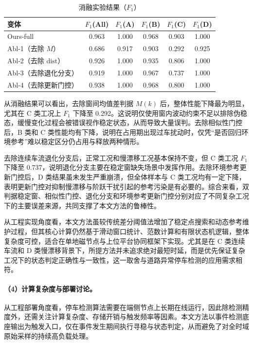 \documentclass{xdupgthesis}
\begin{document}
\begin{table}[!htbp]
    \centering
    \caption{消融实验结果（$F_1$）}
    \label{tab:ch4_ablation}
    \small
    \setlength{\tabcolsep}{7pt}
    \begin{tabular}{lccccc}
        \hline
        变体 & $F_1$(All) & $F_1$(A) & $F_1$(B) & $F_1$(C) & $F_1$(D) \\
        \hline
        Ours-full & 0.963 & 1.000 & 0.968 & 0.903 & 1.000 \\
        Abl-1（去除 $M$） & 0.686 & 0.917 & 0.903 & 0.292 & 0.925 \\
        Abl-2（去除 $\mathrm{dist}$） & 0.926 & 1.000 & 0.935 & 0.806 & 1.000 \\
        Abl-3（去除退化分支） & 0.919 & 1.000 & 0.967 & 0.737 & 1.000 \\
        Abl-4（去除更新门控） & 0.938 & 1.000 & 0.968 & 0.800 & 1.000 \\
        \hline
    \end{tabular}
\end{table}

从消融结果可以看出，去除窗间均值差判据 $M(k)$ 后，整体性能下降最为明显，尤其在 C 类工况上 $F_1$ 下降至 0.292。这说明仅使用窗内波动约束不足以排除伪稳态，缓慢变化过程会被错误视作稳定状态，从而导致大量误判。去除相似性门控后，B 类和 C 类性能均有下降，说明在占用期出现过车扰动时，仅凭“是否回归环境参考”难以稳定区分仍占用与释放两种情形。

去除连续车流退化分支后，正常工况和慢漂移工况基本保持不变，但 C 类工况 $F_1$ 下降至 0.737，说明退化分支主要在稳定窗缺失场景中发挥作用。去除环境参考更新门控后，D 类结果虽未发生严重崩溃，但全体样本与 C 类工况均有一定下降，表明更新门控对抑制慢漂移与阶跃干扰引起的参考污染是有必要的。综合来看，双判据稳定窗、相似性门控、退化分支和环境参考更新门控分别对应了不同复杂工况下的主要误差来源，共同支撑了本文方法的鲁棒性。

从工程实现角度看，本文方法虽较传统差分阈值法增加了稳定点搜索和动态参考维护过程，但其核心计算仍然基于滑动窗口统计、范数计算和有限状态机逻辑，整体复杂度可控，适合在单地磁节点与上位平台协同框架下实现。尤其是在 C 类连续车流和 D 类慢漂移背景下，所提方法并未追求绝对最短时延，而是优先保证复杂工况下的状态判定正确性与一致性，这一取舍与道路异常停车检测的应用需求相符。


\paragraph{（4）计算复杂度与部署讨论。}
从工程部署角度看，停车检测算法需要在端侧节点上长期在线运行，因此除检测精度外，还需关注计算复杂度、存储开销与触发频率等因素。本文方法以事件检测底座输出为触发入口，仅在事件发生期间执行寻稳与状态判定，从而避免了对全时域原始采样的持续高负载处理。
\end{document}
